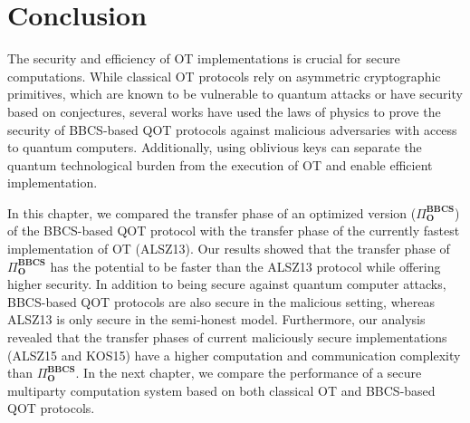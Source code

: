 \section{Conclusion}


The security and efficiency of OT implementations is crucial for secure computations. While classical OT protocols rely on asymmetric cryptographic primitives, which are known to be vulnerable to quantum attacks or have security based on conjectures, several works \cite{Lemus20, BCKM21, GLSV21, U10} have used the laws of physics to prove the security of BBCS-based QOT protocols against malicious adversaries with access to quantum computers. Additionally, using oblivious keys can separate the quantum technological burden from the execution of OT and enable efficient implementation.

In this chapter, we compared the transfer phase of an optimized version ($\Pi^{\textbf{BBCS}}_{\textbf{O}}$) of the BBCS-based QOT protocol with the transfer phase of the currently fastest implementation of OT (ALSZ13). Our results showed that the transfer phase of $\Pi^{\textbf{BBCS}}_{\textbf{O}}$ has the potential to be faster than the ALSZ13 protocol while offering higher security. In addition to being secure against quantum computer attacks, BBCS-based QOT protocols are also secure in the malicious setting, whereas ALSZ13 is only secure in the semi-honest model. Furthermore, our analysis revealed that the transfer phases of current maliciously secure implementations (ALSZ15 and KOS15) have a higher computation and communication complexity than $\Pi^{\textbf{BBCS}}_{\textbf{O}}$. In the next chapter, we compare the performance of a secure multiparty computation system based on both classical OT and BBCS-based QOT protocols. 

%
%
%
